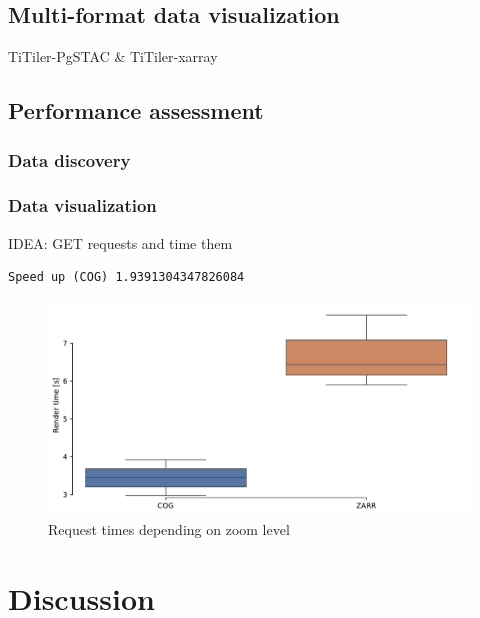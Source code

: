 \documentclass[
  oneside,
  open=any]{scrbook}
\begin{document}
\section{Multi-format data
visualization}\label{multi-format-data-visualization}

TiTiler-PgSTAC \& TiTiler-xarray

\section{Performance assessment}\label{performance-assessment-1}

\subsection{Data discovery}\label{data-discovery}

\subsection{Data visualization}\label{data-visualization}

IDEA: GET requests and time them

\begin{verbatim}
Speed up (COG) 1.9391304347826084
\end{verbatim}

\begin{figure}[H]

{\centering \includegraphics{FinalReport_files/figure-pdf/cell-2-output-2.pdf}

}

\caption{Request times depending on zoom level}

\end{figure}%

\chapter{Discussion}\label{discussion}
\end{document}
